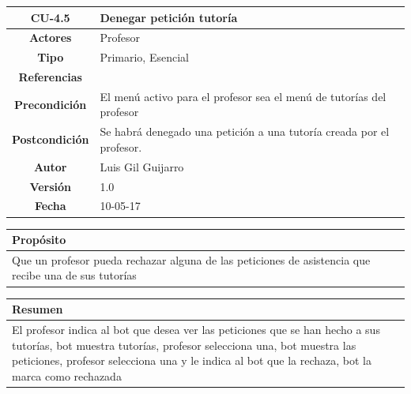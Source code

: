 \begin{table}[!ht]

\begin{tabular}{|c|m{10cm}|}
\hline\rowcolor{Gray}
{\bf CU-4.5 } & { Denegar petición tutoría}\\
\hline
{\bf Actores } & { Profesor} \\
\hline\rowcolor{Gray}
{\bf Tipo } & { Primario, Esencial} \\
\hline
{\bf Referencias }& {} \\
\hline\rowcolor{Gray}
{\bf Precondición }& {El menú activo para el profesor sea el menú de tutorías del profesor} \\
\hline
{\bf Postcondición }& {Se habrá denegado una petición a una tutoría creada por el profesor.}\\
\hline\rowcolor{Gray}
{\bf Autor }& { Luis Gil Guijarro}  \\
\hline
{\bf Versión }& { 1.0} \\
\hline\rowcolor{Gray}
{\bf Fecha }& { 10-05-17} \\
\hline
\end{tabular}

\end{table}

\begin{table}[!ht]

\begin{tabular}{|m{10cm}|}
\hline\rowcolor{Gray}
{\bf Propósito}\\
\hline
{Que un profesor pueda rechazar alguna de las  peticiones de asistencia que recibe una de sus tutorías} \\
\hline

\end{tabular}


\end{table}

\begin{table}[!ht]

\begin{tabular}{|m{10cm}|}
\hline\rowcolor{Gray}
{\bf Resumen}\\
\hline
{El profesor indica al bot que desea ver las peticiones que se han hecho a sus tutorías, bot muestra tutorías, profesor selecciona una, bot muestra las peticiones, profesor selecciona una y le indica al bot que la rechaza, bot la marca como rechazada} \\
\hline

\end{tabular}



\end{table}

